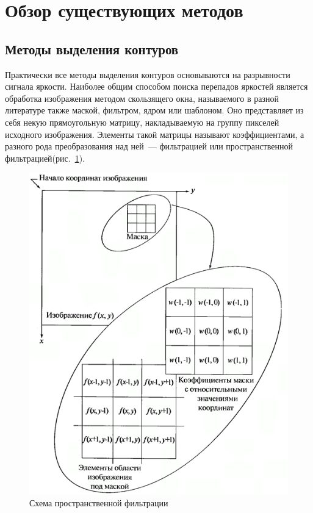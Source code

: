 \documentclass[12pt]{article} %
\begin{document}
\newpage
\section{Обзор существующих методов}

\subsection{Методы выделения контуров}

Практически все методы выделения контуров основываются на разрывности сигнала яркости. Наиболее общим способом поиска перепадов яркостей является обработка изображения методом скользящего окна, называемого в разной литературе также маской, фильтром, ядром или шаблоном. Оно представляет из себя некую прямоугольную матрицу, накладываемую на группу пикселей исходного изображения. Элементы такой матрицы называют коэффициентами, а разного рода преобразования над ней~--- фильтрацией или пространственной фильтрацией(рис.~\ref{fig:prost_filt}).

\begin{figure}[h]
	
	\centering
	
	\includegraphics[width=0.7\linewidth]{prost_filt.jpg}
	
	\caption{Схема пространственной фильтрации}
	
	\label{fig:prost_filt}
	
\end{figure}
\end{document}
